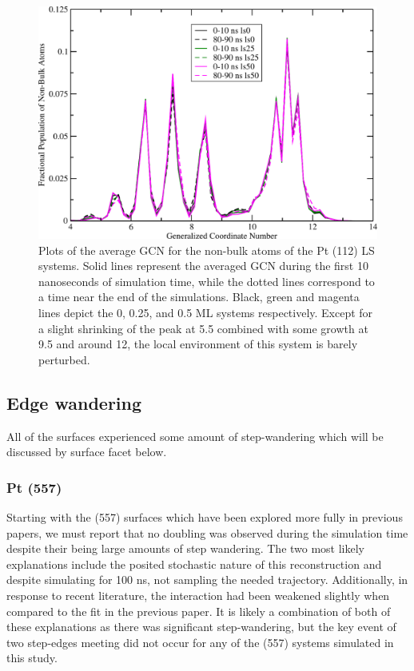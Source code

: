 \begin{figure}[p!]
  \includegraphics[width=\linewidth]{../figures/chap4/112ls_GCNF.pdf}
  \caption{Plots of the average GCN for the non-bulk atoms of the Pt (112) LS
systems. Solid lines represent the averaged GCN during the first 10 nanoseconds
of simulation time, while the dotted lines correspond to a time near the end of
the simulations. Black, green and magenta lines depict the 0, 0.25, and 0.5 ML
systems respectively. Except for a slight shrinking of the peak at 5.5 combined
with some growth at 9.5 and around 12, the local environment of this system is
barely perturbed.}
\label{fig:LS112GCNF}
\end{figure}

\subsection{Edge wandering}
All of the surfaces experienced some amount of step-wandering which will be
discussed by surface facet below.

\subsubsection{Pt (557)}
Starting with the (557) surfaces which have been explored more fully in
previous papers,\citep{Tao:2010aa, Michalka:2013aa} we must  report
that no doubling was observed during the simulation time despite their being
large amounts of step wandering. The two most likely explanations include the
posited stochastic nature of this reconstruction and despite simulating for
100 ns, not sampling the needed trajectory. Additionally, in response to
recent literature\citep{Deshlahra:2012aa}, the  interaction had
been weakened slightly when compared to the fit in the previous
paper.\citep{Michalka:2013aa} It is likely a combination of both of these
explanations as there was significant step-wandering, but the key event of two
step-edges meeting did not occur for any of the (557) systems simulated in this
study.

